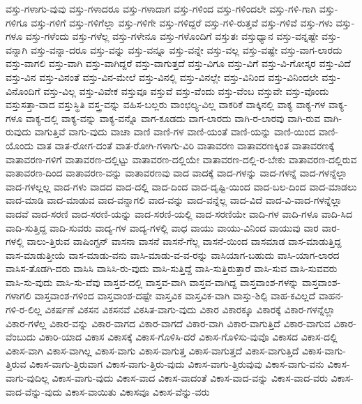 {ವಸ್ತು-ಗಳಾಗು-ವುವು
ವಸ್ತು-ಗಳಾದರೂ
ವಸ್ತು-ಗಳಾದಾಗ
ವಸ್ತು-ಗಳಿಂದ
ವಸ್ತು-ಗಳಿಂದಲೇ
ವಸ್ತು-ಗಳಿ-ಗಾಗಿ
ವಸ್ತು-ಗಳಿಗೂ
ವಸ್ತು-ಗಳಿಗೆ
ವಸ್ತು-ಗಳಿಗೆಲ್ಲಾ
ವಸ್ತು-ಗಳಿಗೇ
ವಸ್ತು-ಗಳಿದ್ದರೆ
ವಸ್ತು-ಗಳಿ-ರುತ್ತವೆ
ವಸ್ತು-ಗಳಿವೆ
ವಸ್ತು-ಗಳು
ವಸ್ತು-ಗಳೂ
ವಸ್ತು-ಗಳೆಂದು
ವಸ್ತು-ಗಳೆಲ್ಲ
ವಸ್ತು-ಗಳೇನೂ
ವಸ್ತು-ಗಳೊಂದಿಗೆ
ವಸ್ತುತಃ
ವಸ್ತುಧ್ಯಾನ
ವಸ್ತು-ವನ್ನಷ್ಟೇ
ವಸ್ತು-ವನ್ನಾಗಿ
ವಸ್ತು-ವನ್ನಾ-ದರೂ
ವಸ್ತು-ವನ್ನು
ವಸ್ತು-ವನ್ನೂ
ವಸ್ತು-ವನ್ನೇ
ವಸ್ತು-ವಲ್ಲ
ವಸ್ತು-ವಷ್ಟೇ
ವಸ್ತು-ವಾಗ-ಲಾರದು
ವಸ್ತು-ವಾಗಲಿ
ವಸ್ತು-ವಾಗಿ
ವಸ್ತು-ವಾಗಿದ್ದರೆ
ವಸ್ತು-ವಾಗುತ್ತದೆ
ವಸ್ತು-ವಿಗೂ
ವಸ್ತು-ವಿಗೆ
ವಸ್ತು-ವಿ-ಗೋಸ್ಕರ
ವಸ್ತು-ವಿದೆ
ವಸ್ತು-ವಿನ
ವಸ್ತು-ವಿನಂತೆ
ವಸ್ತು-ವಿನ-ಮೇಲೆ
ವಸ್ತು-ವಿನಲ್ಲಿ
ವಸ್ತು-ವಿನಲ್ಲೇ
ವಸ್ತು-ವಿನಿಂದ
ವಸ್ತು-ವಿನಿಂದಲೇ
ವಸ್ತು-ವಿನೊಂದಿಗೆ
ವಸ್ತು-ವಿಲ್ಲ
ವಸ್ತು-ವಿವೇಕ
ವಸ್ತುವೂ
ವಸ್ತುವೆ
ವಸ್ತು-ವೆಂದು
ವಸ್ತು-ವೆಂಬ
ವಸ್ತುವೇ
ವಸ್ತು-ವೊಂದು
ವಸ್ತುಸತ್ತಾ-ವಾದ
ವಸ್ತುಸ್ಥಿತಿ
ವಸ್ತ್ರ-ವನ್ನು
ವಹಿಸ-ಬಲ್ಲರು
ವಾಂಛಲ್ಯ-ವಿಲ್ಲ
ವಾಕರಿಕೆ
ವಾಕ್ಕಿನಲ್ಲಿ
ವಾಕ್ಯ
ವಾಕ್ಯ-ಗಳ
ವಾಕ್ಯ-ಗಳೂ
ವಾಕ್ಯ-ದಲ್ಲಿ
ವಾಕ್ಯ-ವನ್ನು
ವಾಕ್ಯ-ವನ್ನೊ
ವಾಗ-ಕೂಡದು
ವಾಗ-ಲಾರದು
ವಾಗಿ-ರ-ಲಾರವು
ವಾಗಿ-ರುವ
ವಾಗಿ-ರುವುದು
ವಾಗುತ್ತಿವೆ
ವಾಗು-ವುದು
ವಾಚಾ
ವಾಣಿ
ವಾಣಿ-ಗಳ
ವಾಣಿ-ಯಂತೆ
ವಾಣಿ-ಯನ್ನು
ವಾಣಿ-ಯಿಂದ
ವಾಣಿ-ಯೊಂದು
ವಾತ
ವಾತ-ರೋಗ-ದಂತೆ
ವಾತ-ರೋಗಿ-ಗಳಾಗು-ವಿರಿ
ವಾತಾವರಣ
ವಾತಾವರಣಕ್ಕಿಂತ
ವಾತಾವರಣಕ್ಕೆ
ವಾತಾವರಣ-ಗಳಿಗೆ
ವಾತಾವರಣ-ದಲ್ಲಿಟ್ಟು
ವಾತಾವರಣ-ದಲ್ಲಿಯೇ
ವಾತಾವರಣ-ದಲ್ಲಿ-ರ-ಬೇಕು
ವಾತಾವರಣ-ದಲ್ಲಿರುವ
ವಾತಾವರಣ-ದಿಂದ
ವಾತಾವರಣ-ವನ್ನು
ವಾತಾವರಣವು
ವಾದ
ವಾದಕ್ಕೆ
ವಾದ-ಗಳನ್ನು
ವಾದ-ಗಳನ್ನೆ
ವಾದ-ಗಳನ್ನೆಲ್ಲಾ
ವಾದ-ಗಳಲ್ಲಲ್ಲ
ವಾದ-ಗಳು
ವಾದದ
ವಾದ-ದಲ್ಲಿ
ವಾದ-ದಿಂದ
ವಾದ-ದೃಷ್ಟಿ-ಯಿಂದ
ವಾದ-ಬಲ-ದಿಂದ
ವಾದ-ಮಾಡಲು
ವಾದ-ಮಾಡಿ
ವಾದ-ಮಾಡುವ
ವಾದ-ವನ್ನಾಗಲಿ
ವಾದ-ವನ್ನು
ವಾದ-ವನ್ನೆಲ್ಲ
ವಾದ-ವಿದೆ
ವಾದ-ವಿ-ವಾದ-ಗಳನ್ನೆಲ್ಲಾ
ವಾದವೆ
ವಾದ-ಸರಣಿ
ವಾದ-ಸರಣಿ-ಯನ್ನು
ವಾದ-ಸರಣಿ-ಯಲ್ಲಿ
ವಾದ-ಸರಣಿಯೇ
ವಾದಿ-ಗಳ
ವಾದಿ-ಗಳೂ
ವಾದಿ-ಸಿದ
ವಾದಿ-ಸುತ್ತಿದ್ದ
ವಾದಿ-ಸುವರು
ವಾದ್ಯ-ಗಳ
ವಾದ್ಯ-ಗಳಲ್ಲಿ
ವಾಧ
ವಾಯು
ವಾಯು-ವಿನಿಂದ
ವಾಯುವು
ವಾರ
ವಾರ-ಗಳಲ್ಲಿ
ವಾಲು-ತ್ತಿರುವ
ವಾಷಿಂಗ್ಟನ್
ವಾಸನಾ
ವಾಸನೆ
ವಾಸನೆ-ಗೆಲ್ಲ
ವಾಸನೆ-ಯಿಂದ
ವಾಸಮಾಡ
ವಾಸ-ಮಾಡುತ್ತಿದ್ದ
ವಾಸ-ಮಾಡುತ್ತೀಯೆ
ವಾಸ-ಮಾಡು-ವನು
ವಾಸಿ-ಮಾಡು-ವ-ವ-ರನ್ನು
ವಾಸಿಯಾಗ-ಬಹುದು
ವಾಸಿ-ಯಾಗ-ಲಾರದ
ವಾಸಿಸ-ತೊಡಗಿ-ದರು
ವಾಸಿಸಿ
ವಾಸಿಸಿ-ರು-ವುದು
ವಾಸಿ-ಸುತ್ತಿದ್ದೆ
ವಾಸಿ-ಸುತ್ತಿರುತ್ತಾರೆ
ವಾಸಿ-ಸುವ
ವಾಸಿ-ಸುವವರು
ವಾಸಿ-ಸು-ವುದು
ವಾಸಿ-ಸು-ವೆವು
ವಾಸ್ತವ-ದಲ್ಲಿ
ವಾಸ್ತವ-ವಾಗಿ
ವಾಸ್ತವ-ವಾಗಿದ್ದ
ವಾಸ್ತವಾಂಶ-ಗಳನ್ನು
ವಾಸ್ತವಾಂಶ-ಗಳಾಗಲಿ
ವಾಸ್ತವಾಂಶ-ಗಳಿಂದ
ವಾಸ್ತವಾಂಶ-ದಷ್ಟೇ
ವಾಸ್ತವಿಕ
ವಾಸ್ತವಿಕ-ವಾಗಿ
ವಾಸ್ತು-ಶಿಲ್ಪಿ
ವಾಹ-ಕವಿಲ್ಲದೆ
ವಾಹನ-ಗಳಿ-ರ-ಲಿಲ್ಲ
ವಿಕರ್ಷಣೆ
ವಿಕಸನ
ವಿಕಸನವೆ
ವಿಕಸಿತ-ವಾಗು-ವುದು
ವಿಕಾರ
ವಿಕಾರಕ್ಕೂ
ವಿಕಾರಕ್ಕೆ
ವಿಕಾರ-ಗಳನ್ನೆಲ್ಲಾ
ವಿಕಾರ-ಗಳೆಲ್ಲ
ವಿಕಾರ-ವನ್ನು
ವಿಕಾರ-ವಾಗದ
ವಿಕಾರ-ವಾಗದೆ
ವಿಕಾರ-ವಾಗಿ
ವಿಕಾರ-ವಾಗುತ್ತಿದೆ
ವಿಕಾರ-ವಾಗುವ
ವಿಕಾರ-ವೆಂಬುದು
ವಿಕಾರಿ-ಯಾದ
ವಿಕಾಸ
ವಿಕಾಸಕ್ಕೆ
ವಿಕಾಸ-ಗೊಳಿಸಿ-ದರೆ
ವಿಕಾಸ-ಗೊಳಿಸು-ವುವೊ
ವಿಕಾಸದ
ವಿಕಾಸ-ದಲ್ಲಿ
ವಿಕಾಸ-ವಾಗಿ
ವಿಕಾಸ-ವಾಗಿಲ್ಲ
ವಿಕಾಸ-ವಾಗು
ವಿಕಾಸ-ವಾಗುತ್ತ
ವಿಕಾಸ-ವಾಗುತ್ತದೆ
ವಿಕಾಸ-ವಾಗುತ್ತಿದೆ
ವಿಕಾಸ-ವಾಗು-ತ್ತಿರುವ
ವಿಕಾಸ-ವಾಗು-ತ್ತಿರುವಾಗ
ವಿಕಾಸ-ವಾಗು-ತ್ತಿರು-ವುದು
ವಿಕಾಸ-ವಾಗು-ತ್ತಿರುವುವು
ವಿಕಾಸ-ವಾಗು-ವನು
ವಿಕಾಸ-ವಾಗು-ವುದಿಲ್ಲ
ವಿಕಾಸ-ವಾಗು-ವುದು
ವಿಕಾಸ-ವಾದ
ವಿಕಾಸ-ವಾದಂತೆ
ವಿಕಾಸ-ವಾದ-ವನ್ನು
ವಿಕಾಸ-ವಾದ-ವರು
ವಿಕಾಸ-ವಾದ-ವೆನ್ನು-ವುದು
ವಿಕಾಸ-ವಾಯಿತು
ವಿಕಾಸವೂ
ವಿಕಾಸ-ವೆನ್ನು-ವರು
}
